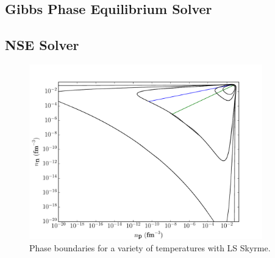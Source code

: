 \documentclass[11pt,letter]{article}
\begin{document}
\subsection{Gibbs Phase Equilibrium Solver}
\subsection{NSE Solver}

\begin{figure}[t]
\centering
\includegraphics[width=0.9\textwidth]{PhaseBoundaryDensity.pdf}
\vspace*{-0.35cm}
\caption{ Phase boundaries for a variety of temperatures with LS Skyrme.}
\vspace*{-0.7cm}
\end{figure}
\end{document}

